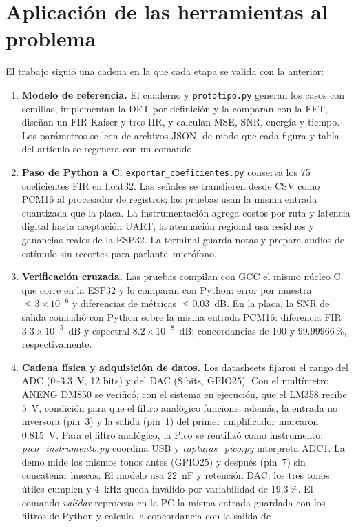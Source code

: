 \documentclass[10pt,a4paper]{article}
\begin{document}
\section{Aplicación de las herramientas al problema}
El trabajo siguió una cadena en la que cada etapa se valida con la anterior:
\begin{enumerate}
\item \textbf{Modelo de referencia.} El cuaderno y \texttt{prototipo.py} generan los
casos con semillas, implementan la DFT por definición y la comparan con la FFT, diseñan
un FIR Kaiser y tres IIR, y calculan MSE, SNR, energía y tiempo. Los parámetros se leen
de archivos JSON, de modo que cada figura y tabla del artículo se regenera con un comando.
\item \textbf{Paso de Python a C.} \texttt{exportar\_coeficientes.py} conserva los 75
coeficientes FIR en float32. Las señales se transfieren desde CSV como PCM16 al
procesador de registros; las pruebas usan la misma entrada cuantizada que la placa.
La instrumentación agrega costos por ruta y latencia digital hasta aceptación UART;
la atenuación regional usa residuos y ganancias reales de la ESP32. La terminal
guarda notas y prepara audios de estímulo sin recortes para parlante--micrófono.
\item \textbf{Verificación cruzada.} Las pruebas compilan con GCC el mismo núcleo C que
corre en la ESP32 y lo comparan con Python: error por muestra $\leq3\times10^{-6}$ y
diferencias de métricas $\leq0.03$~dB. En la placa, la SNR de salida coincidió con
Python sobre la misma entrada PCM16: diferencia FIR $3.3\times10^{-5}$~dB y espectral
$8.2\times10^{-8}$~dB; concordancias de 100 y 99.99966\,\%, respectivamente.
\item \textbf{Cadena física y adquisición de datos.} Los datasheets fijaron el rango
del ADC (0--3.3~V, 12 bits) y del DAC (8 bits, GPIO25). Con el multímetro ANENG DM850 se verificó,
con el sistema en ejecución, que el LM358 recibe 5~V, condición para que el filtro
analógico funcione; además, la entrada no inversora (pin~3) y la salida (pin~1) del
primer amplificador marcaron 0.815~V. Para el filtro analógico, la Pico se reutilizó
como instrumento: \emph{pico\_instrumento.py} coordina USB y
\emph{capturas\_pico.py} interpreta ADC1. La demo mide los mismos tonos antes
(GPIO25) y después (pin~7) sin concatenar huecos. El modelo usa 22~nF y retención DAC;
los tres tonos útiles cumplen y 4~kHz queda inválido por variabilidad de 19.3\,\%.
El comando \emph{validar} reprocesa en la PC la misma
entrada guardada con los filtros de Python y calcula la concordancia con la salida de

\end{enumerate}
\end{document}
